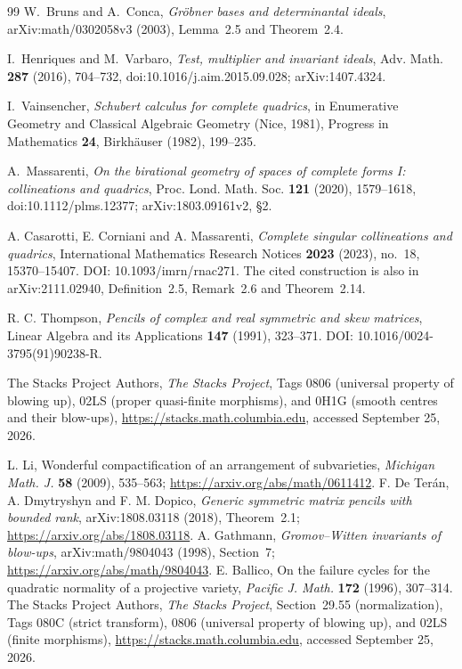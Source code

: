 \documentclass[11pt,reqno]{amsart}
\numberwithin{equation}{section}
\theoremstyle{definition}\newtheorem{definition}[theorem]{Definition}
\theoremstyle{remark}\newtheorem{remark}[theorem]{Remark}
\begin{document}
\begin{thebibliography}{99}
W.~Bruns and A.~Conca,
\emph{Gr\"obner bases and determinantal ideals},
arXiv:math/0302058v3 (2003), Lemma~2.5 and Theorem~2.4.

I.~Henriques and M.~Varbaro,
\emph{Test, multiplier and invariant ideals},
Adv. Math. \textbf{287} (2016), 704--732,
doi:10.1016/j.aim.2015.09.028; arXiv:1407.4324.

I.~Vainsencher,
\emph{Schubert calculus for complete quadrics},
in Enumerative Geometry and Classical Algebraic Geometry (Nice, 1981),
Progress in Mathematics \textbf{24}, Birkh\"auser (1982), 199--235.

A.~Massarenti,
\emph{On the birational geometry of spaces of complete forms I:
collineations and quadrics},
Proc. Lond. Math. Soc. \textbf{121} (2020), 1579--1618,
doi:10.1112/plms.12377; arXiv:1803.09161v2, \S2.

A. Casarotti, E. Corniani and A. Massarenti,
\emph{Complete singular collineations and quadrics},
International Mathematics Research Notices \textbf{2023} (2023),
no.~18, 15370--15407. DOI: 10.1093/imrn/rnac271.
The cited construction is also in arXiv:2111.02940,
Definition~2.5, Remark~2.6 and Theorem~2.14.

R. C. Thompson, \emph{Pencils of complex and real symmetric and skew
matrices}, Linear Algebra and its Applications \textbf{147} (1991),
323--371. DOI: 10.1016/0024-3795(91)90238-R.


The Stacks Project Authors, \emph{The Stacks Project},
Tags 0806 (universal property of blowing up), 02LS (proper quasi-finite
morphisms), and 0H1G (smooth centres and their blow-ups),
\url{https://stacks.math.columbia.edu}, accessed September 25, 2026.

L. Li, Wonderful compactification of an arrangement of subvarieties,
\emph{Michigan Math. J.} \textbf{58} (2009), 535--563;
\url{https://arxiv.org/abs/math/0611412}.
F. De Ter\'an, A. Dmytryshyn and F. M. Dopico,
\emph{Generic symmetric matrix pencils with bounded rank},
arXiv:1808.03118 (2018), Theorem~2.1;
\url{https://arxiv.org/abs/1808.03118}.
A. Gathmann, \emph{Gromov--Witten invariants of blow-ups},
arXiv:math/9804043 (1998), Section~7;
\url{https://arxiv.org/abs/math/9804043}.
E. Ballico, On the failure cycles for the quadratic normality of a
projective variety, \emph{Pacific J. Math.} \textbf{172} (1996),
307--314.
The Stacks Project Authors, \emph{The Stacks Project},
Section~29.55 (normalization), Tags 080C (strict transform),
0806 (universal property of blowing up), and 02LS (finite morphisms),
\url{https://stacks.math.columbia.edu}, accessed September 25, 2026.


\end{thebibliography}
\end{document}
